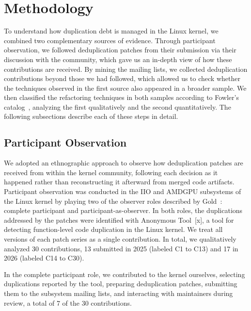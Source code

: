 \documentclass[10pt,conference]{IEEEtran}
\begin{document}
\section{Methodology}\label{sec:methodology}

To understand how duplication debt is managed in the Linux kernel, we combined two complementary sources of evidence. Through participant observation, we followed deduplication patches from their submission via their discussion with the community, which gave us an in-depth view of how these contributions are received. By mining the mailing lists, we collected deduplication contributions beyond those we had followed, which allowed us to check whether the techniques observed in the first source also appeared in a broader sample. We then classified the refactoring techniques in both samples according to Fowler's catalog~\cite{fowler2018refactoring}, analyzing the first qualitatively and the second quantitatively. The following subsections describe each of these steps in detail.

\subsection{Participant Observation}\label{subsec:participant-observation}

We adopted an ethnographic approach to observe how deduplication patches are received from within the kernel community, following each decision as it happened rather than reconstructing it afterward from merged code artifacts.
Participant observation was conducted in the IIO and AMDGPU subsystems of the Linux kernel by playing two of the observer roles described by Gold~\cite{gold1958roles}: complete participant and participant-as-observer. In both roles, the duplications addressed by the patches were identified with Anonymous Tool~[x], a tool for detecting function-level code duplication in the Linux kernel. We treat all versions of each patch series as a single contribution.
In total, we qualitatively analyzed 30 contributions, 13 submitted in 2025 (labeled C1 to C13) and 17 in 2026 (labeled C14 to C30).

In the complete participant role, we contributed to the kernel ourselves, selecting duplications reported by the tool, preparing deduplication patches, submitting them to the subsystem mailing lists, and interacting with maintainers during review, a total of 7 of the 30 contributions.
\end{document}
